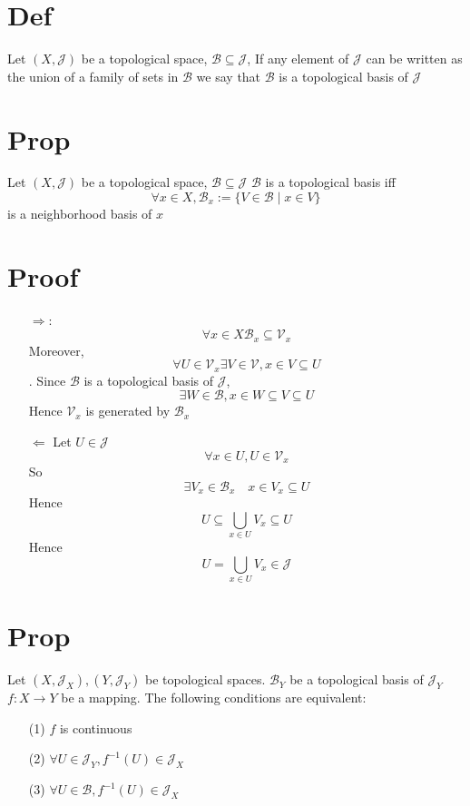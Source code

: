 \documentclass{book}
\begin{document}
\section{Def}
Let $(X,\mathcal{J})$ be a topological  space, $\mathscr{B}\subseteq \mathcal{J}$, If any element of $\mathcal{J}$ can be written as the union of a family of sets in $\mathscr{B}$ we say that $\mathscr{B}$ is a topological basis of $\mathcal{J}$
\section{Prop}
Let $(X,\mathcal{J})$ be a topological space, $\mathscr{B}\subseteq \mathcal{J}$ $\mathscr{B}$ is a topological basis iff $$\forall x\in X,\mathscr{B}_x:=\{V\in  \mathscr{B}\mid x\in V\}$$is a neighborhood basis of $x$
\section{Proof}
\begin{itemize}
    \item [$\Rightarrow:$]$$\forall x\in X \mathscr{B}_x\subseteq \mathcal{V}_x$$ Moreover, $$\forall U\in \mathcal{V}_x\exists V\in \mathcal{V}, x\in V\subseteq U$$. Since $\mathscr{B}$ is a topological basis of $\mathcal{J}$, $$\exists W\in \mathscr{B}, x\in W\subseteq V\subseteq U$$ Hence $\mathcal{V}_x$ is generated by $\mathscr{B}_x$
    \item [$\Leftarrow$]Let $U\in \mathcal{J}$$$\forall x\in U,U\in \mathcal{V}_x$$So $$\exists V_x\in \mathscr{B}_x\quad x\in V_x\subseteq U$$Hence$$U\subseteq\bigcup\limits_{x\in U}V_x\subseteq U$$Hence $$U=\bigcup\limits_{x\in U}V_x\in \mathcal{J}$$
\end{itemize}
\section{Prop}Let $(X,\mathcal{J}_X),(Y,\mathcal{J}_Y)$ be topological spaces. $\mathscr{B}_Y$ be a topological basis of $\mathcal{J}_Y$ $f:X\rightarrow Y$ be a mapping. The following conditions are equivalent:
\begin{itemize}
    \item [(1)]$f$ is continuous
    \item [(2)]$\forall U\in \mathcal{J}_Y, f^{-1}(U)\in \mathcal{J}_X$
    \item [(3)]$\forall U\in \mathscr{B}, f^{-1}(U)\in \mathcal{J}_X$
\end{itemize} 
\end{document}
